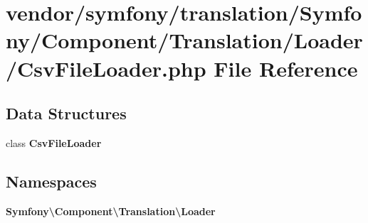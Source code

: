 \section{vendor/symfony/translation/\+Symfony/\+Component/\+Translation/\+Loader/\+Csv\+File\+Loader.php File Reference}
\label{_csv_file_loader_8php}
\subsection*{Data Structures}
\begin{DoxyCompactItemize}
\item 
class {\bf Csv\+File\+Loader}
\end{DoxyCompactItemize}
\subsection*{Namespaces}
\begin{DoxyCompactItemize}
\item 
 {\bf Symfony\textbackslash{}\+Component\textbackslash{}\+Translation\textbackslash{}\+Loader}
\end{DoxyCompactItemize}
